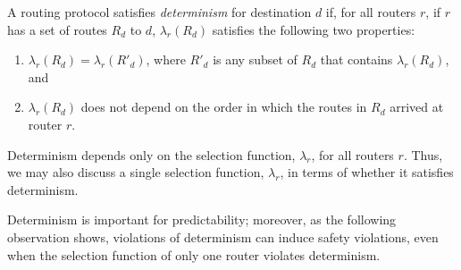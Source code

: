 \begin{defn}[Determinism]\label{def:determinism}
A routing protocol satisfies {\em determinism} for destination $d$ if,
for all routers $r$, if $r$ has a set of routes $R_d$ to $d$,
$\lambda_r(R_d)$ satisfies the following two properties:
\begin{enumerate}
\itemsep=-1pt
\item $\lambda_r(R_d) = \lambda_r(R'_d)$, where $R'_d$ is any subset of
  $R_d$ that contains $\lambda_r(R_d)$, and
\item $\lambda_r(R_d)$ does not depend on the order in which the routes
  in $R_d$ arrived at router $r$.
\end{enumerate}
Determinism depends only on the
selection function, $\lambda_r$, for all routers $r$.  Thus, we may also
discuss a single selection function, $\lambda_r$, in terms of whether it
satisfies determinism.
\end{defn}

Determinism is important for predictability; moreover, as the following
observation shows, violations of determinism can induce safety
violations, even when the selection function of only one router violates
determinism.


